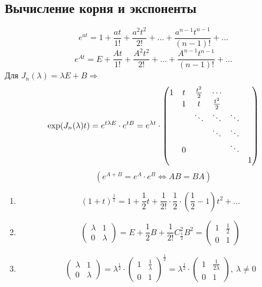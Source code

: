     \subsection{Вычисление корня и экспоненты}
    $$e^{at} = 1 + \frac{at}{1!} + \frac{a^2t^2}{2!} + ... + \frac{a^{n-1}t^{n-1}}{(n-1)!} + ...$$
    $$e^{At} = E + \frac{At}{1!} + \frac{A^2t^2}{2!} + ... + \frac{A^{n-1}t^{n-1}}{(n-1)!} + ...$$
    Для $J_n(\lambda) = \lambda E + B \Longrightarrow$ 
    $$\exp (J_n(\lambda)t) = e^{t \lambda E} \cdot e^{tB} = e^{\lambda t}\cdot \begin{pmatrix}
        1 & t & \frac{t^2}{2} & \cdots\\
        \null & 1 & t & \frac{t^2}{2}\\
        \null & \null & \ddots & \ddots & \ddots\\
        \null & \null & \null & \ddots & \ddots & \null\\
        \null & 0 & \null & \null & \ddots \\
        \null & \null & \null & \null & \null & 1
    \end{pmatrix}
    $$
    $$(e^{A + B} = e^A \cdot e^B \Longleftrightarrow AB = BA)$$
    \begin{example}\tab
        \begin{enumerate}
            \item $$(1 + t)^{\frac{1}{2}} = 1 + \frac{1}{2}t +      \frac{1}{2!}\cdot \frac{1}{2}\cdot(\frac{1}{2}-1)t^2 + ...$$
            \item $$\begin{pmatrix}
            \lambda & 1 \\
                0 & \lambda
                \end{pmatrix} = E + \frac{1}{2}B + \frac{1}{2!}C^2_{\frac{1}{2}}B^2 = \begin{pmatrix}
                1 & \frac{1}{2} \\
                0 & 1
                \end{pmatrix}$$
            \item $$\begin{pmatrix}
                    \lambda & 1 \\
                    0 & \lambda
                \end{pmatrix} = \lambda^{\frac{1}{2}} \cdot \begin{pmatrix}
                    1 & \frac{1}{\lambda} \\ 0 & 1
                \end{pmatrix}^{\frac{1}{2}} = \lambda^{\frac{1}{2}} \cdot \begin{pmatrix}
                    1 & \frac{1}{2\lambda} \\
                    0 & 1
                \end{pmatrix},  \ \lambda \neq 0$$
        \end{enumerate}
    \end{example}

    
    
    